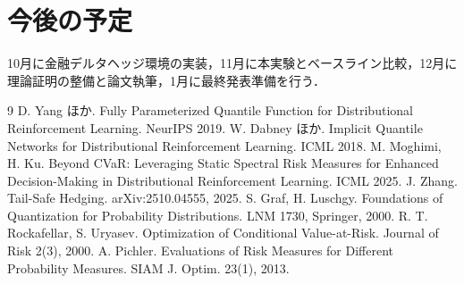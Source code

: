 \documentclass[a4paper,twocolumn,10pt]{jsarticle}
\begin{document}
\section{今後の予定}
10月に金融デルタヘッジ環境の実装，11月に本実験とベースライン比較，12月に理論証明の整備と論文執筆，1月に最終発表準備を行う．

\begin{thebibliography}{9}
\footnotesize
\setlength{\itemsep}{-1pt}
\setlength{\parskip}{0pt}
 D. Yang ほか. Fully Parameterized Quantile Function for Distributional Reinforcement Learning. NeurIPS 2019.
 W. Dabney ほか. Implicit Quantile Networks for Distributional Reinforcement Learning. ICML 2018.
 M. Moghimi, H. Ku. Beyond CVaR: Leveraging Static Spectral Risk Measures for Enhanced Decision-Making in Distributional Reinforcement Learning. ICML 2025.
 J. Zhang. Tail-Safe Hedging. arXiv:2510.04555, 2025.
 S. Graf, H. Luschgy. Foundations of Quantization for Probability Distributions. LNM 1730, Springer, 2000.
 R. T. Rockafellar, S. Uryasev. Optimization of Conditional Value-at-Risk. Journal of Risk 2(3), 2000.
 A. Pichler. Evaluations of Risk Measures for Different Probability Measures. SIAM J. Optim. 23(1), 2013.
\end{thebibliography}
\end{document}
